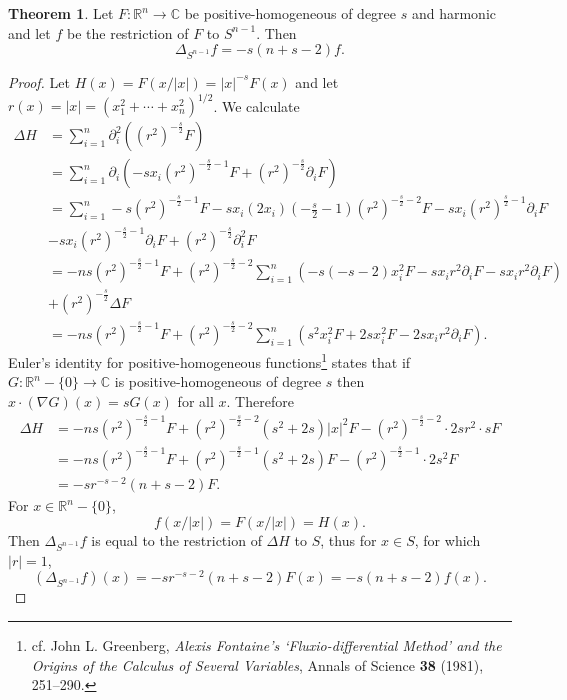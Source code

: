 \documentclass{article}
\theoremstyle{definition}
\newtheorem{theorem}{Theorem}
\theoremstyle{definition}
\begin{document}
\begin{theorem}
Let $F:\mathbb{R}^n \to \mathbb{C}$ be positive-homogeneous of degree $s$ and harmonic and let $f$ be the restriction of $F$ to $S^{n-1}$. Then
\[
\Delta_{S^{n-1}} f = -s(n+s-2)f.
\]
\label{Seigenvalue}
\end{theorem}
\begin{proof}
Let $H(x)=F(x/|x|)=|x|^{-s}F(x)$ and let $r(x)=|x|=(x_1^2+\cdots+x_n^2)^{1/2}$.
We calculate
\begin{align*}
\Delta H&=\sum_{i=1}^n \partial_i^2 ((r^2)^{-\frac{s}{2}} F)\\
&=\sum_{i=1}^n \partial_i\left(-s x_i (r^2)^{-\frac{s}{2}-1} F + (r^2)^{-\frac{s}{2}} \partial_i F\right)\\
&=\sum_{i=1}^n -s(r^2)^{-\frac{s}{2}-1} F  -  sx_i(2x_i)\left(-\frac{s}{2}-1\right) (r^2)^{-\frac{s}{2}-2} F
-sx_i(r^2)^{\frac{s}{2}-1} \partial_i F\\
&-sx_i (r^2)^{-\frac{s}{2}-1}\partial_i F
+(r^2)^{-\frac{s}{2}} \partial_i^2 F\\
&=-ns(r^2)^{-\frac{s}{2}-1} F +(r^2)^{-\frac{s}{2}-2} \sum_{i=1}^n \left( -s(-s-2)x_i^2F- sx_ir^2 \partial_i F
-sx_i r^2 \partial_i F\right)\\
&+(r^2)^{-\frac{s}{2}} \Delta F\\
&=-ns(r^2)^{-\frac{s}{2}-1} F+(r^2)^{-\frac{s}{2}-2} \sum_{i=1}^n (s^2 x_i^2 F+2sx_i^2 F - 2sx_ir^2 \partial_i F).
\end{align*}
Euler's identity for positive-homogeneous functions\footnote{cf. John L. Greenberg,
{\em Alexis Fontaine's `Fluxio-differential
Method' and the Origins of the Calculus
of Several Variables}, Annals of Science \textbf{38} (1981), 251--290.}
states that if  $G:\mathbb{R}^n - \{0\} \to \mathbb{C}$ is positive-homogeneous
of degree $s$ then $x \cdot (\nabla G)(x)=s G(x)$ for all $x$. Therefore
\begin{align*}
\Delta H&=-ns(r^2)^{-\frac{s}{2}-1} F + (r^2)^{-\frac{s}{2}-2} (s^2+2s)|x|^2 F 
- (r^2)^{-\frac{s}{2}-2} \cdot 2sr^2 \cdot s F\\
&=-ns(r^2)^{-\frac{s}{2}-1} F  + (r^2)^{-\frac{s}{2}-1} (s^2+2s) F - (r^2)^{-\frac{s}{2}-1} \cdot 2s^2F\\
&=-sr^{-s-2}(n+s-2)F.
\end{align*}
For $x \in \mathbb{R}^n - \{0\}$,
\[
f(x/|x|) = F(x/|x|) = H(x).
\]
Then $\Delta_{S^{n-1}} f$ is equal to the restriction of $\Delta H$ to $S$, thus for $x \in S$, for which $|r|=1$,
\[
(\Delta_{S^{n-1}} f)(x) = -sr^{-s-2}(n+s-2)F(x) = 
-s(n+s-2)f(x).
\]
\end{proof}
\end{document}
